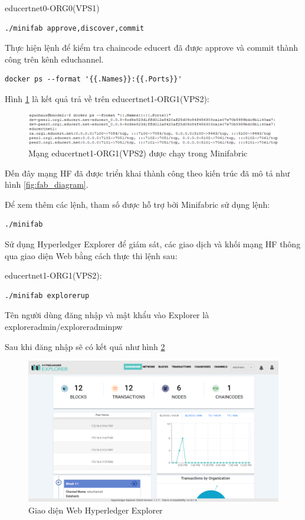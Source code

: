 \begin{enumerate}
    educertnet0-ORG0(VPS1)
     \begin{Verbatim}[fontsize=\small]
       ./minifab approve,discover,commit
    \end{Verbatim}
    
Thực hiện lệnh để kiểm tra chaincode educert đã được approve và commit thành công trên kênh educhannel.
     \begin{Verbatim}[fontsize=\small]
       docker ps --format '{{.Names}}:{{.Ports}}'
    \end{Verbatim}

Hình \ref{fig:educertnet1-ORG1_diagram} là kết quả trả về trên educertnet1-ORG1(VPS2):

    \begin{figure}[H]
    \centering
    \includegraphics[width=.9\linewidth]{img/educertnet1-ORG1.png}
    \caption{Mạng educertnet1-ORG1(VPS2) được chạy trong Minifabric}
    \label{fig:educertnet1-ORG1_diagram}
    \end{figure}


Đến đây mạng HF đã được triển khai thành công theo kiến trúc đã mô tả như hình \ref{fig:fab_diagram}.

Để xem thêm các lệnh, tham số được hỗ trợ bởi Minifabric  sử dụng lệnh: 
     \begin{Verbatim}[fontsize=\small]
       ./minifab
    \end{Verbatim}

Sử dụng Hyperledger Explorer để giám sát, các giao dịch và khối mạng HF thông qua giao diện Web bằng cách thực thi lệnh sau:

educertnet1-ORG1(VPS2):
     \begin{Verbatim}[fontsize=\small]
       ./minifab explorerup
    \end{Verbatim}
    
Tên người dùng đăng nhập và mật khẩu vào Explorer là exploreradmin/exploreradminpw

Sau khi đăng nhập sẽ có kết quả như hình \ref{fig:exploreradmin_diagram}

    \begin{figure}[H]
    \centering
    \includegraphics[width=.9\linewidth]{img/exploreradmin.png}
    \caption{Giao diện Web Hyperledger Explorer}
    \label{fig:exploreradmin_diagram}
    \end{figure}


\end{enumerate}
